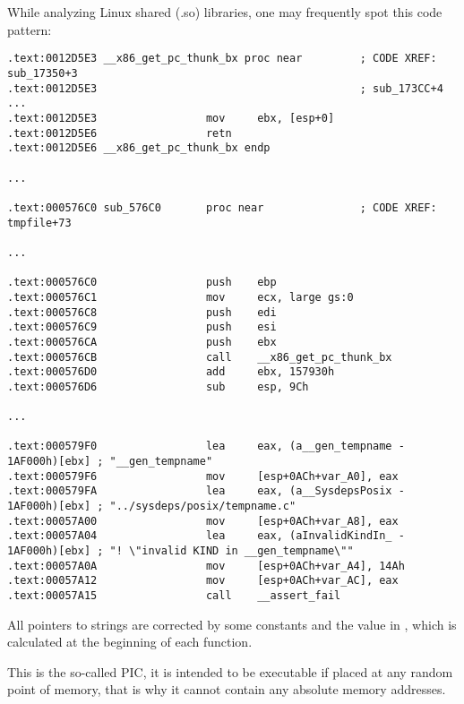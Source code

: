 \section{\CapitalPICcode}
\myindex{\PICcode}
\label{sec:PIC}

While analyzing Linux shared (.so) libraries, one may frequently spot this code pattern:

\begin{lstlisting}[caption=libc-2.17.so x86]
.text:0012D5E3 __x86_get_pc_thunk_bx proc near         ; CODE XREF: sub_17350+3
.text:0012D5E3                                         ; sub_173CC+4 ...
.text:0012D5E3                 mov     ebx, [esp+0]
.text:0012D5E6                 retn
.text:0012D5E6 __x86_get_pc_thunk_bx endp

...

.text:000576C0 sub_576C0       proc near               ; CODE XREF: tmpfile+73

...

.text:000576C0                 push    ebp
.text:000576C1                 mov     ecx, large gs:0
.text:000576C8                 push    edi
.text:000576C9                 push    esi
.text:000576CA                 push    ebx
.text:000576CB                 call    __x86_get_pc_thunk_bx
.text:000576D0                 add     ebx, 157930h
.text:000576D6                 sub     esp, 9Ch

...

.text:000579F0                 lea     eax, (a__gen_tempname - 1AF000h)[ebx] ; "__gen_tempname"
.text:000579F6                 mov     [esp+0ACh+var_A0], eax
.text:000579FA                 lea     eax, (a__SysdepsPosix - 1AF000h)[ebx] ; "../sysdeps/posix/tempname.c"
.text:00057A00                 mov     [esp+0ACh+var_A8], eax
.text:00057A04                 lea     eax, (aInvalidKindIn_ - 1AF000h)[ebx] ; "! \"invalid KIND in __gen_tempname\""
.text:00057A0A                 mov     [esp+0ACh+var_A4], 14Ah
.text:00057A12                 mov     [esp+0ACh+var_AC], eax
.text:00057A15                 call    __assert_fail
\end{lstlisting}


All pointers to strings are corrected by some constants and the value in \EBX,
which is calculated at the beginning of each function.

This is the so-called \ac{PIC}, it is intended to be executable if placed at any random point of memory, that is why it cannot contain any absolute memory addresses.


